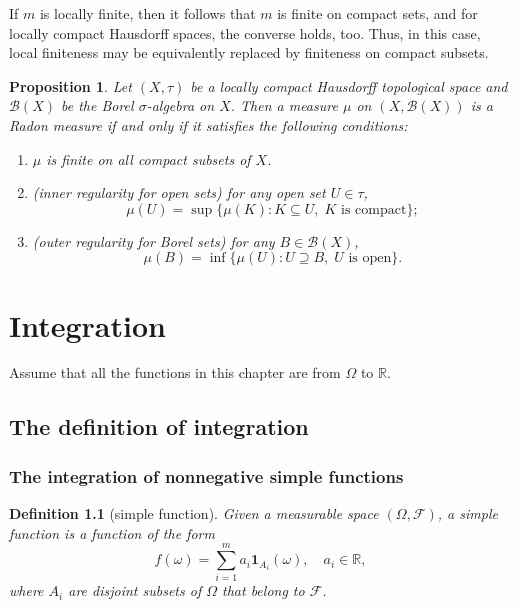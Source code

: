 \documentclass{report}
\newtheorem{definition}{Definition}[section]
\newtheorem{proposition}{Proposition}[section]
\theoremstyle{nonumberplain}
\begin{document}
If $m$ is locally finite, then it follows that $m$ is finite on compact sets, and for locally compact Hausdorff spaces, the converse holds, too. Thus, in this case, local finiteness may be equivalently replaced by finiteness on compact subsets.

\begin{proposition}{}
	Let $(X,\tau)$ be a locally compact Hausdorff topological space and $\mathcal{B}(X)$ be the Borel $\sigma$-algebra on $X$. Then a measure $\mu$ on $(X,\mathcal{B}(X))$ is a Radon measure if and only if it satisfies the following conditions:
	\begin{enumerate}[(1)]
		\item $\mu$ is finite on all compact subsets of $X$.
		\item (inner regularity for open sets) for any open set $U\in \tau$,
		\[
		\mu(U)=\sup\{\mu(K):K\subseteq U,\;K\text{ is compact}\};
		\]
		\item (outer regularity for Borel sets) for any $B\in\mathcal{B}(X)$,
		\[
		\mu(B)=\inf\{\mu(U):U\supseteq B,\;U\text{ is open}\}.
		\]
	\end{enumerate}
\end{proposition}




\chapter{Integration}
Assume that all the functions in this chapter are from $\Omega$ to $\mathbb{R}$.
\section{The definition of integration}
\subsection{The integration of nonnegative simple functions}
\begin{definition}[simple function]
	Given a measurable space $(\Omega, \mathcal{F})$, a simple function is a function of the form
	\[
	f(\omega)=\sum_{i=1}^ma_i\mathbf{1}_{A_i}(\omega),\quad a_i\in\mathbb{R},
	\]
	where $A_i$ are disjoint subsets
	of $\Omega$ that belong to $\mathcal{F}$.
\end{definition}
\end{document}
